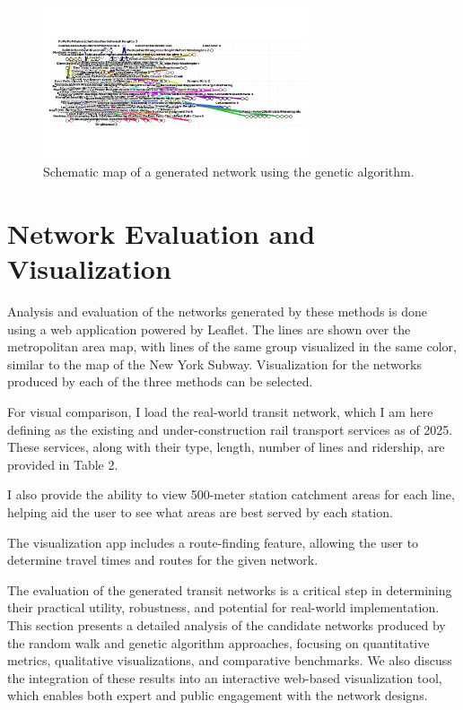 \documentclass[manuscript]{acmart}
\begin{document}
\begin{figure}[h]
    \centering
    \includegraphics[width=0.7\textwidth]{img/lines_genetic.png}
    \caption{Schematic map of a generated network using the genetic algorithm.}
    \label{fig:schematic2}
\end{figure}

\section{Network Evaluation and Visualization}

Analysis and evaluation of the networks generated by these methods is done using a web application powered by Leaflet. The lines are shown over the metropolitan area map, with lines of the same group visualized in the same color, similar to the map of the New York Subway. Visualization for the networks produced by each of the three methods can be selected.

For visual comparison, I load the real-world transit network, which I am here defining as the existing and under-construction rail transport services as of 2025. These services, along with their type, length, number of lines and ridership, are provided in Table 2. 

I also provide the ability to view 500-meter station catchment areas for each line, helping aid the user to see what areas are best served by each station.

The visualization app includes a route-finding feature, allowing the user to determine travel times and routes for the given network.

The evaluation of the generated transit networks is a critical step in determining their practical utility, robustness, and potential for real-world implementation. This section presents a detailed analysis of the candidate networks produced by the random walk and genetic algorithm approaches, focusing on quantitative metrics, qualitative visualizations, and comparative benchmarks. We also discuss the integration of these results into an interactive web-based visualization tool, which enables both expert and public engagement with the network designs.
\end{document}
